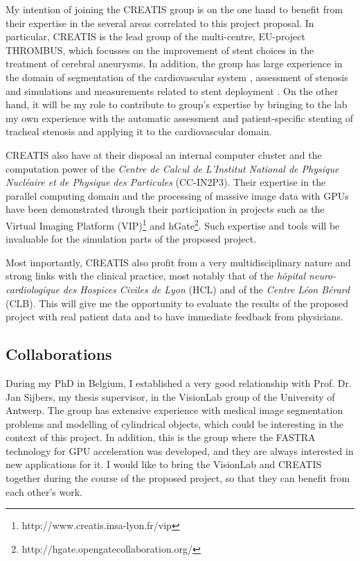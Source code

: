 \documentclass[a4paper]{article}
\newcommand{\citep}{\cite}
\begin{document}
My intention of joining the CREATIS group is on the one hand to benefit from their expertise in the several areas correlated to this project proposal. In particular, CREATIS is the lead group of the multi-centre, EU-project THROMBUS, which focusses on the improvement of stent choices in the treatment of cerebral aneurysms. In addition, the group has large experience in the domain of segmentation of the cardiovascular system \citep{BARB-11c,Florez2,FLOR-07b,ORKI-08}, assessment of stenosis \citep{HERN-06b} and simulations and measurements related to stent deployment \citep{Florez,ATTI-08,ZAHN-11d,BOUS-09c,SULA-08a}. On the other hand, it will be my role to contribute to group's expertise by bringing to the lab my own experience with the automatic assessment and patient-specific stenting of tracheal stenosis and applying it to the cardiovascular domain.

CREATIS also have at their disposal an internal computer cluster and the computation power of the {\it Centre de Calcul de L'Institut National de Physique Nucl\'eaire et de Physique des Particules} (CC-IN2P3). Their expertise in the parallel computing domain and the processing of massive image data with GPUs have been demonstrated through their participation in projects such as the Virtual Imaging Platform (VIP)\footnote{http://www.creatis.insa-lyon.fr/vip} and hGate\footnote{http://hgate.opengatecollaboration.org/}. Such expertise and tools will be invaluable for the simulation parts of the proposed project. 

Most importantly, CREATIS also profit from a very multidisciplinary nature and strong links with the clinical practice, most notably that of the {\it h\^opital neuro-cardiologique des Hospices Civiles de Lyon} (HCL) and of the {\it Centre L\'eon B\'erard} (CLB). This will give me the opportunity to evaluate the results of the proposed project with real patient data and to have immediate feedback from physicians. 

\subsection{Collaborations}

During my PhD in Belgium, I established a very good relationship with Prof. Dr. Jan Sijbers, my thesis supervisor, in the VisionLab group of the University of Antwerp. The group has extensive experience with medical image segmentation problems and modelling of cylindrical objects, which could be interesting in the context of this project. In addition, this is the group where the FASTRA technology for GPU acceleration was developed, and they are always interested in new applications for it. I would like to bring the VisionLab and CREATIS together during the course of the proposed project, so that they can benefit from each other's work.
\end{document}
